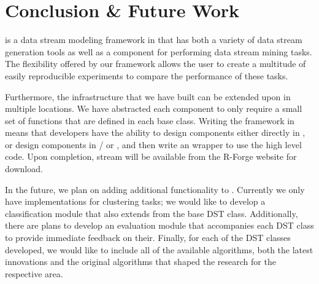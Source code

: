 \documentclass[nojss]{jss}
\begin{document}
\section{Conclusion \& Future Work}
\label{sec:conclusion}

 is a data stream modeling framework in  that has both a variety of data stream generation tools as well as a component for performing data stream mining tasks. The flexibility offered by our framework allows the user to create a multitude of easily reproducible experiments to compare the performance of these tasks.


Furthermore, the infrastructure that we have built can be extended upon in multiple locations. We have abstracted each component to only require a small set of functions that are defined in each base class. Writing the framework in  means that developers have the ability to design components either directly in , or design components in / or , and then write an  wrapper to use the high level code. Upon completion, stream will be available from the R-Forge website for download.


In the future, we plan on adding additional functionality to . Currently we only have implementations for clustering tasks; we would like to develop a classification module that also extends from the base DST class. Additionally, there are plans to develop an evaluation module that accompanies each DST class to provide immediate feedback on their. Finally, for each of the DST classes developed, we would like to include all of the available algorithms, both the latest innovations and the original algorithms that shaped the research for the respective area.




\end{document}
